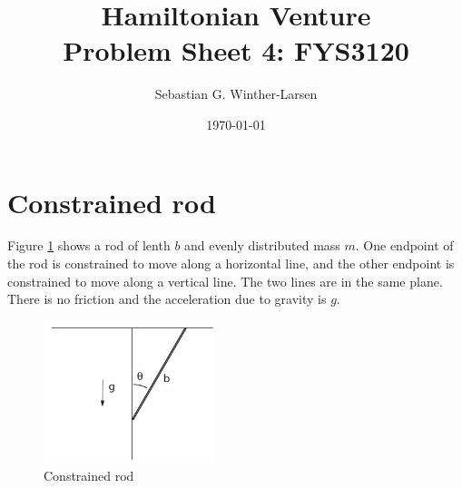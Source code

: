 \documentclass[11pt]{amsart}
\title[Problem Sheet 4]{Hamiltonian Venture\\
	\hrulefill \small{ Problem Sheet 4: FYS3120 } \hrulefill}
\author[Winther-Larsen]{Sebastian G. Winther-Larsen}
\date{\today}
\begin{document}
\maketitle

\section{Constrained rod}

Figure \ref{fig:constrained_rod} shows a rod of lenth $b$ and evenly distributed mass $m$. One endpoint of the rod is constrained to move along a horizontal line, and the other endpoint is constrained to move along a vertical line. The two lines are in the same plane. There is no friction and the acceleration due to gravity is $g$.

\begin{figure}[ht]
\centering
	\includegraphics[width = 0.45\textwidth]{constrained_rod.png}
	\caption{Constrained rod}
	\label{fig:constrained_rod}
\end{figure}
\end{document}
